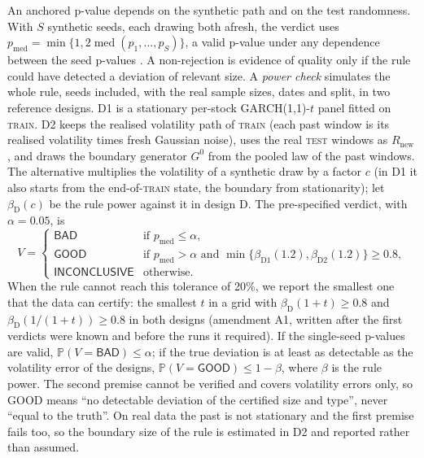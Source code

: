 \documentclass[11pt,a4paper]{article}
\theoremstyle{plain}
\newcommand{\Prob}{\mathbb{P}}
\DeclareMathOperator{\med}{med}
\newcommand{\TRAIN}{\textsc{train}}
\newcommand{\TEST}{\textsc{test}}
\newcommand{\Rnew}{R_{\mathrm{new}}}
\newcommand{\pmed}{p_{\mathrm{med}}}
\newcommand{\GOOD}{\textsf{GOOD}}
\newcommand{\BAD}{\textsf{BAD}}
\newcommand{\INCONCL}{\textsf{INCONCLUSIVE}}
\newcommand{\GARCHt}{GARCH(1,1)-$t$}
\begin{document}
An anchored p-value depends on the synthetic path and on the test randomness. With $S$ synthetic
seeds, each drawing both afresh, the verdict uses $\pmed=\min\{1,2\med(p_1,\dots,p_S)\}$, a valid
p-value under any dependence between the seed p-values \citep{meinshausen_2009_pvalues}. A non-rejection is evidence of quality only if the rule could have
detected a deviation of relevant size. A \emph{power check} simulates the whole rule, seeds
included, with the real sample sizes, dates and split, in two reference designs. D1 is a stationary
per-stock \GARCHt{} panel fitted on \TRAIN. D2 keeps the realised volatility path of \TRAIN{} (each
past window is its realised volatility times fresh Gaussian noise), uses the real \TEST{} windows as
$\Rnew$, and draws the boundary generator $G^0$ from the pooled law of the past windows. The
alternative multiplies the volatility of a synthetic draw by a factor $c$ (in D1 it also starts
from the end-of-\TRAIN{} state, the boundary from stationarity); let
$\beta_{\mathrm D}(c)$ be the rule power against it in design D. The pre-specified verdict, with
$\alpha=0.05$, is
\begin{equation}\label{eq:verdict}
  V=\begin{cases}
    \BAD & \text{if } \pmed\le\alpha,\\
    \GOOD & \text{if } \pmed>\alpha \text{ and } \min\{\beta_{\mathrm{D1}}(1.2),\beta_{\mathrm{D2}}(1.2)\}\ge0.8,\\
    \INCONCL & \text{otherwise.}
  \end{cases}
\end{equation}
When the rule cannot reach this tolerance of 20\%, we report the smallest one that the data can
certify: the smallest $t$ in a grid with $\beta_{\mathrm D}(1+t)\ge0.8$ and
$\beta_{\mathrm D}(1/(1+t))\ge0.8$ in both designs (amendment A1, written after the first verdicts
were known and before the runs it required). If the single-seed p-values are valid,
$\Prob(V=\BAD)\le\alpha$; if the true deviation is at least as detectable as the volatility error
of the designs, $\Prob(V=\GOOD)\le1-\beta$, where $\beta$ is the rule power. The second premise
cannot be verified and covers volatility errors only, so \GOOD{} means ``no detectable deviation of
the certified size and type'', never ``equal to the truth''. On real data the past is not
stationary and the first premise fails too, so the boundary size of the rule is estimated in D2 and
reported rather than assumed.

\end{document}
